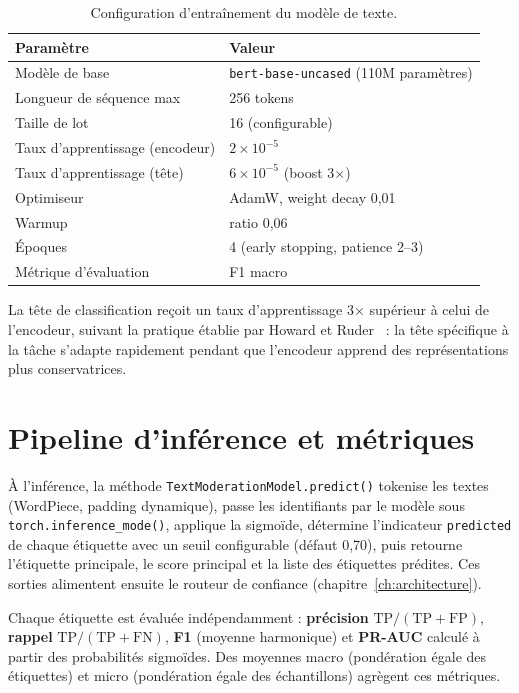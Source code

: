 \begin{table}[H]
\centering
\caption{Configuration d'entraînement du modèle de texte.}
\label{tab:text_training_config}
\begin{tabular}{ll}
\toprule
\textbf{Paramètre} & \textbf{Valeur} \\
\midrule
Modèle de base & \texttt{bert-base-uncased} (110M paramètres) \\
Longueur de séquence max & 256 tokens \\
Taille de lot & 16 (configurable) \\
Taux d'apprentissage (encodeur) & $2 \times 10^{-5}$ \\
Taux d'apprentissage (tête) & $6 \times 10^{-5}$ (boost 3$\times$) \\
Optimiseur & AdamW, weight decay 0,01 \\
Warmup & ratio 0,06 \\
Époques & 4 (early stopping, patience 2--3) \\
Métrique d'évaluation & F1 macro \\
\bottomrule
\end{tabular}
\end{table}

La tête de classification reçoit un taux d'apprentissage 3$\times$ supérieur à celui de l'encodeur, suivant la pratique établie par Howard et Ruder~\cite{howard2018ulmfit} : la tête spécifique à la tâche s'adapte rapidement pendant que l'encodeur apprend des représentations plus conservatrices.

\section{Pipeline d'inférence et métriques}

À l'inférence, la méthode \texttt{TextModerationModel.predict()} tokenise les textes (WordPiece, padding dynamique), passe les identifiants par le modèle sous \texttt{torch.inference\_mode()}, applique la sigmoïde, détermine l'indicateur \texttt{predicted} de chaque étiquette avec un seuil configurable (défaut 0,70), puis retourne l'étiquette principale, le score principal et la liste des étiquettes prédites. Ces sorties alimentent ensuite le routeur de confiance (chapitre~\ref{ch:architecture}).

Chaque étiquette est évaluée indépendamment : \textbf{précision} $\text{TP}/(\text{TP}+\text{FP})$, \textbf{rappel} $\text{TP}/(\text{TP}+\text{FN})$, \textbf{F1} (moyenne harmonique) et \textbf{PR-AUC} calculé à partir des probabilités sigmoïdes. Des moyennes macro (pondération égale des étiquettes) et micro (pondération égale des échantillons) agrègent ces métriques.
